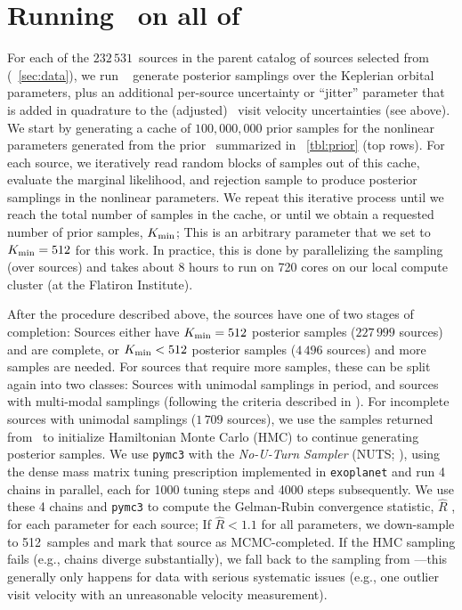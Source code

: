 \documentclass[modern]{aastex63}
\newcommand{\nsources}{\ensuremath{232\,531}}
\newcommand{\Kmin}{K_{\rm min}}
\newcommand{\Kminval}{512}
\begin{document}
\section{Running \thejoker\ on all of \apogee\ } \label{sec:rundr16}

For each of the \nsources\ sources in the parent catalog of sources selected
from \apogee\  (\sectionname~\ref{sec:data}), we run \thejoker\
\citep{thejoker} generate posterior samplings over the Keplerian orbital
parameters, plus an additional per-source uncertainty or ``jitter'' parameter
that is added in quadrature to the (adjusted) \apogee\ visit velocity
uncertainties (see above).
We start by generating a cache of $100,000,000$ prior samples for the nonlinear
parameters generated from the prior \pdf\ summarized in
\tablename~\ref{tbl:prior} (top rows).
For each source, we iteratively read random blocks of samples out of this cache,
evaluate the marginal likelihood, and rejection sample to produce posterior
samplings in the nonlinear parameters.
We repeat this iterative process until we reach the total number of samples in
the cache, or until we obtain a requested number of prior samples, $\Kmin$; This
is an arbitrary parameter that we set to $\Kmin = \Kminval$ for this work.
In practice, this is done by parallelizing the sampling (over sources) and takes
about 8 hours to run on 720 cores on our local compute cluster (at the Flatiron
Institute).

After the procedure described above, the sources have one of two stages of
completion: Sources either have $\Kmin = \Kminval$ posterior samples ($227\,999$
sources) and are complete, or $\Kmin < \Kminval$ posterior samples ($4\,496$
sources) and more samples are needed.
For sources that require more samples, these can be split again into two
classes: Sources with unimodal samplings in period, and sources with multi-modal
samplings (following the criteria described in \citealt{thejoker}).
For incomplete sources with unimodal samplings ($1\,709$ sources), we use the
samples returned from \thejoker\ to initialize Hamiltonian Monte Carlo (HMC) to
continue generating posterior samples.
We use \texttt{pymc3} with the \emph{No-U-Turn Sampler} (NUTS; \citealt{NUTS}),
using the dense mass matrix tuning prescription implemented in
\texttt{exoplanet} \citep{exoplanet:exoplanet} and run 4 chains in parallel,
each for 1000 tuning steps and 4000 steps subsequently.
We use these 4 chains and \texttt{pymc3} to compute the Gelman-Rubin convergence
statistic, $\hat{R}$ \citep{Gelman:1992}, for each parameter for each source; If
$\hat{R} < 1.1$ for all parameters, we down-sample to \Kminval\ samples and mark
that source as MCMC-completed.
If the HMC sampling fails (e.g., chains diverge substantially), we fall back to
the sampling from \thejoker---this generally only happens for data with serious
systematic issues (e.g., one outlier visit velocity with an unreasonable
velocity measurement).
\end{document}
